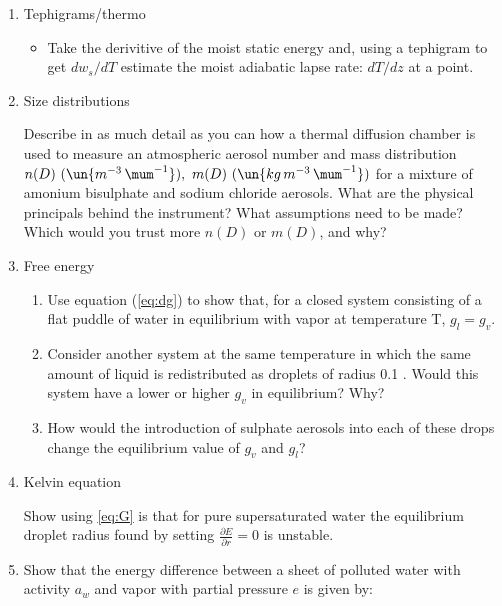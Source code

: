\documentclass[12pt]{article}
\begin{document}
\noindent

\begin{enumerate}


\item Tephigrams/thermo

  \begin{itemize}
  \item Take the derivitive of the moist static energy and, using a tephigram
  to get $dw_s/dT$
  estimate the moist adiabatic lapse rate:  $dT/dz$ at a point.


  \end{itemize}



\item  Size distributions

\par

Describe in as much detail as you can how a thermal diffusion
chamber is used to measure an atmospheric aerosol number and mass
distribution $n(D)\ (\un{m^{-3}\,\mum^{-1}}),\ m(D)\
(\un{kg\,m^{-3}\,\mum^{-1}})$ for a mixture of amonium bisulphate and
sodium chloride aerosols.  What are the physical principals
behind the instrument?  What assumptions need to be made?  Which would
you trust more $n(D)$ or $m(D)$, and why?



\item  Free energy

  \begin{enumerate}
  \item Use equation (\ref{eq:dg}) to show that, for a closed system consisting of a
flat puddle of water in equilibrium with vapor at temperature T, $g_l = g_v$.
\item Consider another system at the same temperature in which the same amount of liquid is
  redistributed as droplets of radius 0.1 \mum.  Would this system have
  a lower or higher $g_v$ in equilibrium?  Why?
\item How would the introduction of sulphate aerosols into each of these drops
change the equilibrium value of $g_v$ and $g_l$?
  \end{enumerate}


\item Kelvin equation

Show using \ref{eq:G} is that for pure supersaturated water
the equilibrium droplet radius found by setting
$\frac{\partial E }{\partial r} = 0$ is unstable.


\item Show that the energy difference between a sheet of polluted
water with activity $a_w$ and vapor with partial pressure
$e$ is given by:


\end{enumerate}
\end{document}
